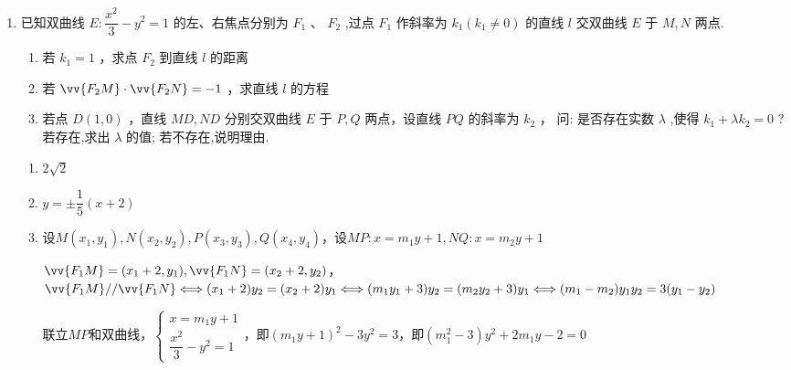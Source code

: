 \begin{enumerate}
\begin{enumerate}
\begin{jieda}
\begin{enumerate}
            代入方程$\left(m^2 + 1\right) {y}_{1}{y}_{2} - {3m}\left( {{y}_{1} + {y}_{2}}\right)  + {10} = 0$，得$\left( {{m}^{2} + 1}\right)  \cdot  \dfrac{3{b}^{2}}{{b}^{2}{m}^{2} - 1} - {3m} \cdot  \dfrac{4{b}^{2}m}{{b}^{2}{m}^{2} - 1} + {10} = 0$ ,
            整理得 ${b}^{2}m^2 + 3{b}^{2} - {10} = 0$ ,所以 ${b}^{2} = \dfrac{10}{{m}^{2} + 3} \leq \dfrac{10}{3}$，取最大值时$b = \dfrac{\sqrt{30}}{3}, m = 0$，满足要求，故 $b$ 的最大值为 $\dfrac{\sqrt{30}}{3}$ .
        \end{enumerate}
    \end{jieda}
    \item 已知双曲线 $E : \dfrac{{x}^{2}}{3} - {y}^{2} = 1$ 的左、右焦点分别为 ${F}_{1}\text{ 、 }{F}_{2}$ ,过点 ${F}_{1}$ 作斜率为 ${k}_{1}\left( {{k}_{1} \neq  0}\right)$ 的直线 $l$ 交双曲线 $E$ 于 $M,N$ 两点.
    \begin{enumerate}
        \item 若 ${k}_{1} = 1$ ，求点 ${F}_{2}$ 到直线 $l$ 的距离
        \item 若 $\vv{{F}_{2}M} \cdot  \vv{{F}_{2}N} =  - 1$ ，求直线 $l$ 的方程
        \item 若点 $D\left( {1,0}\right)$ ，直线 ${MD},{ND}$ 分别交双曲线 $E$ 于 $P,Q$ 两点，设直线 ${PQ}$ 的斜率为 ${k}_{2}$ ， 问: 是否存在实数 $\lambda$ ,使得 ${k}_{1} + \lambda {k}_{2} = 0$ ? 若存在,求出 $\lambda$ 的值; 若不存在,说明理由.
    \end{enumerate}
    \begin{jieda}
        \begin{enumerate}
            \item $2\sqrt{2}$
            \item $y = \pm \dfrac{1}{5}(x+2)$
            \item 设$M(x_1, y_1), N(x_2, y_2), P(x_3, y_3), Q(x_4, y_4)$，设$MP: x = m_1y+1, NQ: x = m_2y+1$
            
            $\vv{F_1M} = (x_1+2, y_1), \vv{F_1N} = (x_2+2, y_2)$，$\vv{F_1M} // \vv{F_1N} \Longleftrightarrow (x_1+2)y_2 = (x_2+2)y_1 \Longleftrightarrow (m_1y_1+3)y_2  = (m_2y_2+3)y_1 \Longleftrightarrow (m_1-m_2)y_1y_2 = 3(y_1-y_2)$

            联立$MP$和双曲线，$\left\{\begin{array}{l}
                x = m_1y+1 \\
                \dfrac{x^2}{3} - y^2 = 1
            \end{array}\right.$，即$(m_1y+1)^2-3y^2=3$，即$(m_1^2-3)y^2+2m_1y-2 = 0$


\end{enumerate}
\end{jieda}
\end{enumerate}
\end{enumerate}
